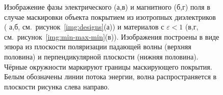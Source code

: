 \begin{figure}[p]
  \begin{minipage}[ht]{0.495\linewidth}
  \end{minipage}
  \hfill
  \begin{minipage}[ht]{0.495\linewidth}
  \end{minipage}
  \begin{minipage}[ht]{0.495\linewidth}
  \end{minipage}
  \hfill
  \begin{minipage}[ht]{0.495\linewidth}
  \end{minipage}

  \caption{Изображение фазы электрического (а,в) и магнитного (б,г)
    поля в случае маскировки объекта покрытием из изотропных
    диэлектриков ( а,б, см.~рисунок~\ref{img:designs}(а)) и материалов
    с ${\varepsilon <1}$ (в,г,
    см.~рисунок~\ref{img:min-max-min}(в)). Изображения построены в
    виде эпюра из плоскости поляризации падающей волны (верхняя
    половина) и перпендикулярной плоскости (нижняя половина). Чёрные
    окружности маркируют границы маскирующего покрытия. Белым
    обозначены линии потока энергии, волна распространяется в
    плоскости рисунка слева направо.}
  \label{img:field-phase}
\end{figure}

